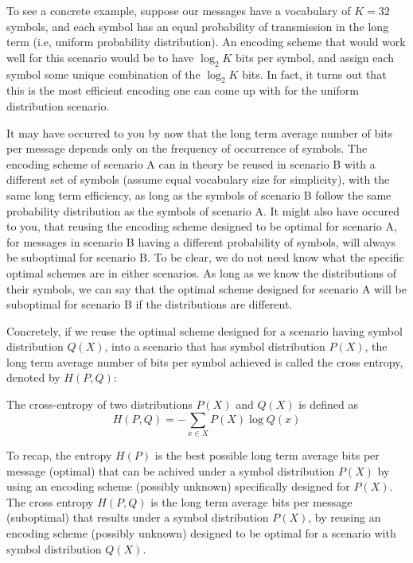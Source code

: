 \documentclass[a4paper]{article}
\begin{document}
To see a concrete example, suppose our messages have a
vocabulary of $K = 32$ symbols, and each symbol has an equal
probability of transmission in the long term (i.e, uniform
probability distribution). An encoding scheme that would
work well for this scenario would be to have $\log_2 K$ bits
per symbol, and assign each symbol some unique combination
of the $\log_2 K$ bits. In fact, it turns out that this is the
most efficient encoding one can come up with for the uniform
distribution scenario.

It may have occurred to you by now that the long term average
number of bits per message depends only on the frequency of
occurrence of symbols. The encoding scheme of scenario A can
in theory be reused in scenario B with a different set of
symbols (assume equal vocabulary size for simplicity),
with the same long term efficiency, as long as the symbols
of scenario B follow the same probability distribution as the
symbols of scenario A. It might also have occured to you,
that reusing the encoding scheme designed to be optimal for
scenario A, for messages in scenario B having a different
probability of symbols, will always be suboptimal for
scenario B. To be clear, we do not need know what the
specific optimal schemes are in either scenarios. As long
as we know the distributions of their symbols, we can say
that the optimal scheme designed for scenario A will be
suboptimal for scenario B if the distributions are different.

Concretely, if we reuse the optimal scheme designed for a
scenario having symbol distribution $Q(X)$, into a scenario
that has symbol distribution $P(X)$, the long term average
number of bits per symbol achieved is called the cross entropy,
denoted by $H(P,Q)$:

\begin{defi}
  The cross-entropy of two distributions $P(X)$
  and $Q(X)$ is defined as
  \[
  H(P, Q) = - \sum_{x \in X} P(X) \log Q(x)
  \]
\end{defi}

To recap, the entropy $H(P)$ is the best possible long term
average bits per message (optimal) that can be achived under
a symbol distribution $P(X)$ by using an encoding scheme
(possibly unknown) specifically designed for $P(X)$.
The cross entropy $H(P,Q)$ is the long term average bits
per message (suboptimal) that results under a symbol
distribution $P(X)$, by reusing an encoding scheme
(possibly unknown) designed to be optimal for a scenario
with symbol distribution $Q(X)$.
\end{document}
